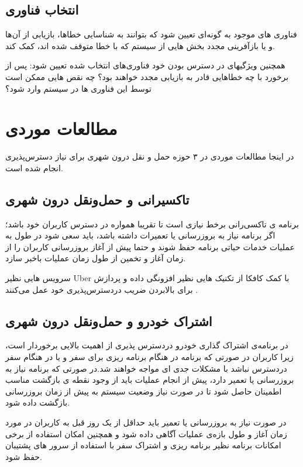 \subsection{انتخاب فناوری}
فناوری های موجود به گونه‌ای تعیین شود که بتوانند به شناسایی خطا‌ها، بازیابی از آن‌ها و یا بازآفرینی مجدد بخش هایی از سیستم که با خطا متوقف شده اند، کمک کند.

همچنین ویژگیهای در دسترس بودن خود فناوری‌های انتخاب شده تعیین شود: پس از برخورد با چه خطا‌هایی قادر به بازیابی مجدد خواهند بود؟ چه نقص هایی ممکن است توسط این فناوری ها در سیستم وارد شود؟


\section{مطالعات موردی}

در اینجا مطالعات موردی در ۳ حوزه حمل و نقل درون شهری برای نیاز دسترس‌پذیری انجام شده است. 
\subsection{تاکسیرانی و حمل‌و‌نقل درون شهری}
برنامه ی تاکسی‌رانی برخط نیازی است تا تقریبا همواره در دسترس کاربران خود باشد؛ اگر برنامه نیاز به بروز‌رسانی یا تعمیرات داشته باشد، باید سعی شود در طول به عملیات خدمات حیاتی برنامه حفظ شوند و حتما پیش از آغاز بروزرسانی کاربران را از زمان آغاز و تخمین از طول زمان عملیات باخبر سازد.

سرویس هایی نظیر Uber با کمک کافکا از تکنیک هایی نظیر افزونگی داده و پردازش برای بالابردن ضریب دردسترس‌پذیری خود عمل می‌کنند \cite{uber_kafka}.
\subsection{اشتراک خودرو و حمل‌و‌نقل درون شهری}
در برنامه‌ی اشتراک گذاری خودرو دردسترس پذیری از اهمیت بالایی برخوردار است، زیرا کاربران در صورتی که برنامه در هنگام برنامه ریزی برای سفر و یا در هنگام سفر دردسترس نباشد با مشکلات جدی ای مواجه خواهند شد.در صورتی که برنامه نیاز به بروزرسانی یا تعمیر دارد، پیش از انجام عملیات باید از وجود نقطه ی بازگشت مناسب اطمینان حاصل شود تا در صورت نیاز وضعیت سیستم به پیش از زمان بروزرسانی بازگشت داده شود.

در صورت نیاز به بروزرسانی یا تعمیر باید حداقل از یک روز قبل به کاربران در مورد زمان آغاز و طول بازه‌ی عملیات آگاهی  داده شود و همچنین امکان استفاده از برخی امکانات برنامه نظیر برنامه ریزی و اشتراک سفر با استفاده از سرور های پشتیبان حفظ شود.
